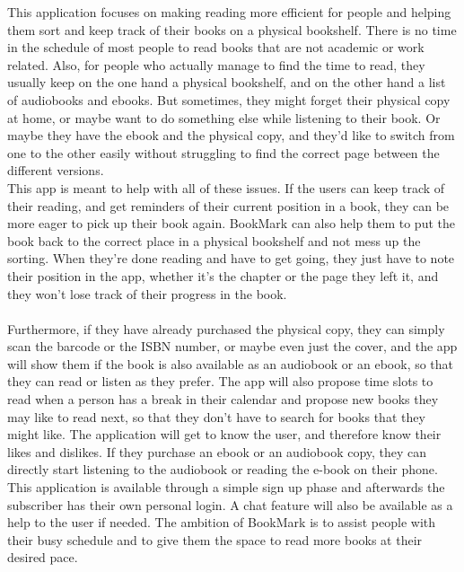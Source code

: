 \documentclass[conference]{IEEEtran}
\begin{document}
This application focuses on making reading more efficient for people and helping them sort and keep track of their books on a physical bookshelf. There is no time in the schedule of most people to read books that are not academic or work related. Also, for people who actually manage to find the time to read, they usually keep on the one hand a physical bookshelf, and on the other hand a list of audiobooks and ebooks. But sometimes, they might forget their physical copy at home, or maybe want to do something else while listening to their book. Or maybe they have the ebook and the physical copy, and they'd like to switch from one to the other easily without struggling to find the correct page between the different versions.\\
This app is meant to help with all of these issues. If the users can keep track of their reading, and get reminders of their current position in a book, they can be more eager to pick up their book again. BookMark can also help them to put the book back to the correct place in a physical bookshelf and not mess up the sorting. When they're done reading and have to get going, they just have to note their position in the app, whether it's the chapter or the page they left it, and they won't lose track of their progress in the book.\\ \\

Furthermore, if they have already purchased the physical copy, they can simply scan the barcode or the ISBN number, or maybe even just the cover, and the app will show them if the book is also available as an audiobook or an ebook, so that they can read or listen as they prefer. The app will also propose time slots to read when a person has a break in their calendar and propose new books they may like to read next, so that they don’t have to search for books that they might like. The application will get to know the user, and therefore know their likes and dislikes. If they purchase an ebook or an audiobook copy, they can directly start listening to the audiobook or reading the e-book on their phone. This application is available through a simple sign up phase and afterwards the subscriber has their own personal login. A chat feature will also be available as a help to the user if needed. The ambition of BookMark is to assist people with their busy schedule and to give them the space to read more books at their desired pace.
\end{document}
